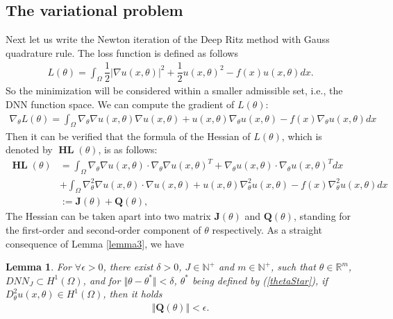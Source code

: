 \documentclass[a4paper, 11pt]{article}
\numberwithin{equation}{section}
\newtheorem{lemma}{\textbf{Lemma}}
\begin{document}
\subsection{The variational problem}
\quad\quad Next let us write the Newton iteration of the Deep Ritz method with Gauss quadrature rule. The loss function is defined as follows
\begin{align}\label{lossfuncL}
L(\theta) = \int_{\Omega} \dfrac{1}{2} \vert\nabla u(x,\theta)\vert^2 + \dfrac{1}{2} u(x,\theta)^2 - f(x) u(x,\theta) dx.
\end{align}
So the minimization will be considered within a smaller admissible set, i.e., the DNN function space. We can compute the gradient of $L(\theta)$:
\begin{align}\label{gradL}
\nabla_{\theta}L(\theta) = \int_{\Omega} \nabla_{\theta} \nabla u(x,\theta) \nabla u(x,\theta) + u(x,\theta) \nabla_{\theta}u(x,\theta) - f(x)\nabla_{\theta}u(x,\theta) dx
\end{align}
Then it can be verified that the formula of the Hessian of $L(\theta)$, which is denoted by $\boldsymbol{\operatorname{HL}}(\theta)$, is as follows:
\begin{align}\label{HessianL}
\boldsymbol{\operatorname{HL}}(\theta) &= \int_{\Omega} \nabla_{\theta} \nabla u(x,\theta) \cdot
\nabla_{\theta}  \nabla u(x,\theta)^{T}
+ \nabla_{\theta}u(x,\theta) \cdot \nabla_{\theta}u(x,\theta)^{T} dx \\
&+ \int_{\Omega} \nabla^2_{\theta} \nabla u(x,\theta) \cdot \nabla u(x,\theta) + u(x,\theta) \nabla^2_{\theta}u(x,\theta) - f(x)\nabla^2_{\theta}u(x,\theta) dx
\\
&:= \boldsymbol{J}(\theta)+  \boldsymbol{Q}(\theta), 
\end{align}
The Hessian can be taken apart into two matrix $\boldsymbol{J}(\theta)$ and $\boldsymbol{Q}(\theta)$, standing for the first-order and second-order component of $\theta$ respectively. As a straight consequence of Lemma \ref{lemma3}, we have 

\begin{lemma}\label{lemma4}
For $\forall \epsilon > 0$, there exist $\delta > 0$, $J\in \mathbb{N}^{+}$ and $m\in \mathbb{N}^{+}$, 
such that $ \theta\in \mathbb{R}^m$, $DNN_J\subset H^1(\Omega)$, and for $
\Vert \theta-\theta^* \Vert < \delta$, $ \theta^*$ being defined by (\ref{thetaStar}), if $ D^2_{\theta} u(x,\theta) \in H^1(\Omega)$, then it holds 
\begin{align}
\Vert \boldsymbol{Q}(\theta)\Vert < \epsilon.
\end{align}
\end{lemma}
\end{document}
